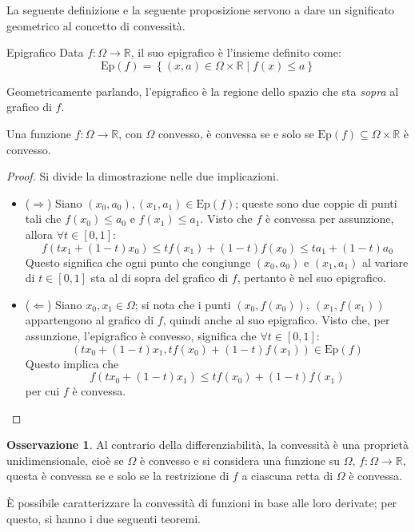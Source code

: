 \documentclass[11pt, a4paper]{scrartcl}
\theoremstyle{definition}
\numberwithin{esempio}{section}
\theoremstyle{definition}
\newtheorem{obs}{Osservazione}
\numberwithin{obs}{section}
\numberwithin{nota}{section}
\numberwithin{equation}{subsection}
\begin{document}
\noindent La seguente definizione e la seguente proposizione servono a dare un significato geometrico al concetto di convessit\`a.
\begin{definizione}
	{Epigrafico}{}
	Data $f:\Omega \to\mathbb{R}$, il suo epigrafico \`e l'insieme definito come:
	\[
	\mathrm{Ep} (f) = \left\{ (x,a) \in \Omega \times \mathbb{R}  \mid f(x) \le  a \right\} 
	\] 
\end{definizione}
\noindent Geometricamente parlando, l'epigrafico \`e la regione dello spazio che sta \textit{sopra} al grafico di $f$.
\begin{prop}
	{}{}
	Una funzione $f:\Omega \to\mathbb{R}$, con $\Omega $ convesso, \`e convessa se e solo se $\mathrm{Ep} (f) \subseteq \Omega \times \mathbb{R}$ \`e convesso.
	\begin{proof}
		Si divide la dimostrazione nelle due implicazioni.
		\begin{itemize}
			\item ($\Rightarrow $) Siano $(x_0,a_0), (x_1,a_1) \in \mathrm{Ep} (f)$; queste sono due coppie di punti tali che $f(x_0) \le a_0$ e $f(x_1) \le  a_1$.
				Visto che $f$ \`e convessa per assunzione, allora $\forall t \in [0,1]$:
				\[
				f(tx_1 + (1-t)x_0) \le t f(x_1) + (1-t)f(x_0) \le ta_1 +(1-t) a_0
				\] 
				Questo significa che ogni punto che congiunge $(x_0,a_0)$ e $(x_1,a_1)$ al variare di $t \in [0,1]$ sta al di sopra del grafico di $f$, pertanto \`e nel suo epigrafico.
			\item ($\Leftarrow$) Siano $x_0,x_1 \in \Omega $; si nota che i punti $(x_0,f(x_0)), \ (x_1,f(x_1))$ appartengono al grafico di $f$, quindi anche al suo epigrafico.
				Visto che, per assunzione, l'epigrafico \`e convesso, significa che $\forall t \in [0,1]$:
				\[
					(tx_0+(1-t) x_1, tf(x_0) + (1-t) f(x_1)) \in \mathrm{Ep} (f)
				\] 
			Questo implica che 
			\[
			f(tx_0 + (1-t)x_1) \le t f(x_0) + (1-t) f(x_1)
			\] 
			per cui $f$ \`e convessa.
		\end{itemize}
	\end{proof}
\end{prop}
\begin{obs}
	Al contrario della differenziabilit\`a, la convessit\`a \`e una propriet\`a unidimensionale, cio\`e se $\Omega $ \`e convesso e si considera una funzione su $\Omega $, $f:\Omega \to \mathbb{R}$, questa \`e convessa se e solo se la restrizione di $f$ a ciascuna retta di $\Omega$ \`e convessa.
\end{obs}
\noindent \`E possibile caratterizzare la convessit\`a di funzioni in base alle loro derivate; per questo, si hanno i due seguenti teoremi.
\end{document}
